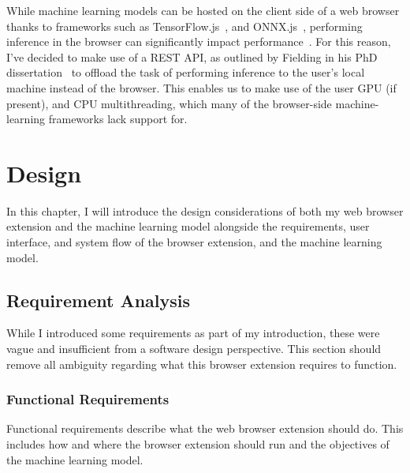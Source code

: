 \documentclass{report}
\begin{document}
While machine learning models can be hosted on the client side of a web browser thanks to frameworks such as TensorFlow.js~\cite{tensorflow2015whitepaper}, and ONNX.js~\cite{onnxruntime}, performing inference in the browser can significantly impact performance~\cite{yun2019moving}. For this reason, I've decided to make use of a REST API, as outlined by Fielding in his PhD dissertation~\cite{fielding2000phd} to offload the task of performing inference to the user's local machine instead of the browser. This enables us to make use of the user GPU (if present), and CPU multithreading, which many of the browser-side machine-learning frameworks lack support for. 


\chapter{Design}
\label{chap:design}

In this chapter, I will introduce the design considerations of both my web browser extension and the machine learning model alongside the requirements, user interface, and system flow of the browser extension, and the machine learning model. 

\section{Requirement Analysis}\label{sec:requirement-analysis}

While I introduced some requirements as part of my introduction, these were vague and insufficient from a software design perspective. This section should remove all ambiguity regarding what this browser extension requires to function.  


\subsection{Functional Requirements}

Functional requirements describe what the web browser extension should do. This includes how and where the browser extension should run and the objectives of the machine learning model.
\end{document}
